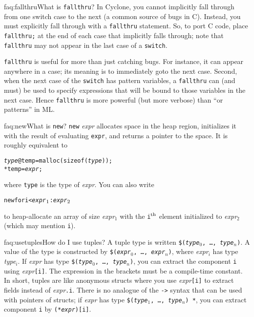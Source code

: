 \begin{faqa}{faq:fallthru}{What is \texttt{fallthru}?}
In Cyclone, you cannot implicitly fall through from one switch case to
the next (a common source of bugs in C).  Instead, you must explicitly
fall through with a \texttt{fallthru} statement.  So, to port C code,
place \texttt{fallthru;} at the end of each case that implicitly falls
through; note that \texttt{fallthru} may not appear in the last case
of a \texttt{switch}.

\texttt{fallthru} is useful for more than just catching bugs.  For
instance, it can appear anywhere in a case; its meaning is to
immediately goto the next case.  Second, when the next case of the
\texttt{switch} has pattern variables, a \texttt{fallthru} can (and
must) be used to specify expressions that will be bound to those
variables in the next case.  Hence \texttt{fallthru} is more powerful
(but more verbose) than ``or patterns'' in ML\@.
\end{faqa}

\begin{faqa}{faq:new}{What is \texttt{new}?}
\texttt{new} \textit{expr} allocates space in the heap region,
initializes it with the result of evaluating \texttt{expr}, and
returns a pointer to the space.  It is roughly equivalent to
\begin{alltt}
 \textit{type} @temp = malloc(sizeof(\textit{type}));
 *temp = \textit{expr};
\end{alltt}
where \texttt{type} is the type of \textit{expr}.  You can also write
\begin{alltt}
  new \lb for i < \textit{expr}\(\sb{1}\) : \textit{expr}\(\sb{2}\) \rb
\end{alltt}
to heap-allocate an array of size \textit{expr}$_1$ with the
\texttt{i}$^{\rm th}$ element initialized to \textit{expr}$_2$ (which
may mention \texttt{i}).
\end{faqa}

\begin{faqa}{faq:usetuples}{How do I use tuples?}
A tuple type is written
\texttt{\$(\textit{type}$_0$, \ldots, \textit{type}$_n$)}.
A value of the type is constructed by
\texttt{\$(\textit{expr}$_0$, \ldots, \textit{expr}$_n$)},
where \textit{expr}$_i$ has type \textit{type}$_i$.  
If \textit{expr} has type
\texttt{\$(\textit{type}$_0$, \ldots, \textit{type}$_n$)},
you can extract the component \texttt{i} using
\textit{expr}\texttt{[i]}.
The expression in the brackets must be a compile-time constant.  In
short, tuples are like anonymous structs where you use
\textit{expr}\texttt{[i]} to extract fields instead of
\textit{expr}\texttt{.i}.
There is no analogue of the \texttt{->} syntax that can be used with
pointers of structs; if 
\textit{expr} has type
\texttt{\$(\textit{type}$_1$, \ldots, \textit{type}$_n$) *},
you can extract component \texttt{i} by \texttt{(*\textit{expr})[i]}.
\end{faqa}

